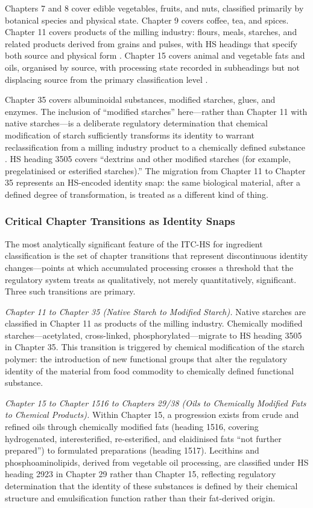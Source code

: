 \documentclass[12pt,a3paper]{article}
\begin{document}
Chapters 7 and 8 cover edible vegetables, fruits, and nuts, classified primarily by botanical species and physical state. Chapter 9 covers coffee, tea, and spices. Chapter 11 covers products of the milling industry: flours, meals, starches, and related products derived from grains and pulses, with HS headings that specify both source and physical form \cite{DGCI_CH11}. Chapter 15 covers animal and vegetable fats and oils, organised by source, with processing state recorded in subheadings but not displacing source from the primary classification level \cite{DGCI_CH15}.

Chapter 35 covers albuminoidal substances, modified starches, glues, and enzymes. The inclusion of ``modified starches'' here---rather than Chapter 11 with native starches---is a deliberate regulatory determination that chemical modification of starch sufficiently transforms its identity to warrant reclassification from a milling industry product to a chemically defined substance \cite{DGCI_CH35}. HS heading 3505 covers ``dextrins and other modified starches (for example, pregelatinised or esterified starches).'' The migration from Chapter 11 to Chapter 35 represents an HS-encoded identity snap: the same biological material, after a defined degree of transformation, is treated as a different kind of thing.

\subsubsection{Critical Chapter Transitions as Identity Snaps}

The most analytically significant feature of the ITC-HS for ingredient classification is the set of chapter transitions that represent discontinuous identity changes---points at which accumulated processing crosses a threshold that the regulatory system treats as qualitatively, not merely quantitatively, significant. Three such transitions are primary.

\textit{Chapter 11 to Chapter 35 (Native Starch to Modified Starch).} Native starches are classified in Chapter 11 as products of the milling industry. Chemically modified starches---acetylated, cross-linked, phosphorylated---migrate to HS heading 3505 in Chapter 35. This transition is triggered by chemical modification of the starch polymer: the introduction of new functional groups that alter the regulatory identity of the material from food commodity to chemically defined functional substance.

\textit{Chapter 15 to Chapter 1516 to Chapters 29/38 (Oils to Chemically Modified Fats to Chemical Products).} Within Chapter 15, a progression exists from crude and refined oils through chemically modified fats (heading 1516, covering hydrogenated, interesterified, re-esterified, and elaidinised fats ``not further prepared'') to formulated preparations (heading 1517). Lecithins and phosphoaminolipids, derived from vegetable oil processing, are classified under HS heading 2923 in Chapter 29 rather than Chapter 15, reflecting regulatory determination that the identity of these substances is defined by their chemical structure and emulsification function rather than their fat-derived origin.
\end{document}
